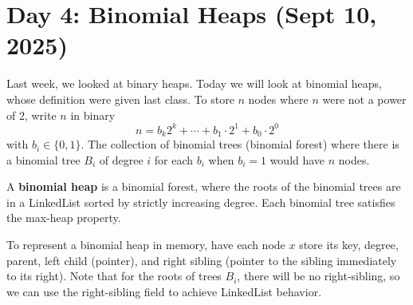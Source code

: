 \section{Day 4: Binomial Heaps (Sept 10, 2025)}

Last week, we looked at binary heaps. Today we will look at binomial heaps, whose definition were given last class. To store $n$ nodes where $n$ were not a power of 2, write $n$ in binary
\[
n = b_k2^k + \cdots + b_1 \cdot 2^1 + b_0 \cdot 2^0
\]
with $b_i \in \{ 0, 1 \}$. The collection of binomial trees (binomial forest) where there is a binomial tree $B_i$ of degree $i$ for each $b_i$ when $b_i = 1$ would have $n$ nodes.

A \textbf{binomial heap} is a binomial forest, where the roots of the binomial trees are in a LinkedList sorted by strictly increasing degree. Each binomial tree satisfies the max-heap property.

To represent a binomial heap in memory, have each node $x$ store its key, degree, parent, left child (pointer), and right sibling (pointer to the sibling immediately to its right). Note that for the roots of trees $B_i$, there will be no right-sibling, so we can use the right-sibling field to achieve LinkedList behavior.

